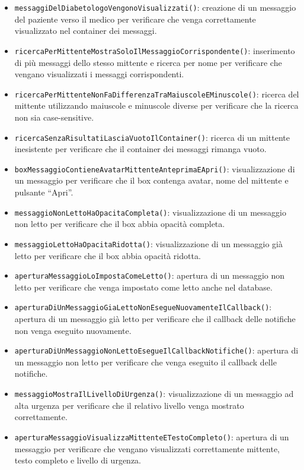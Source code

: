 \begin{itemize}
	
	\item \texttt{messaggiDelDiabetologoVengonoVisualizzati()}: creazione di un messaggio del paziente verso il medico per verificare che venga correttamente visualizzato nel container dei messaggi.
	
	\item \texttt{ricercaPerMittenteMostraSoloIlMessaggioCorrispondente()}: inserimento di più messaggi dello stesso mittente e ricerca per nome per verificare che vengano visualizzati i messaggi corrispondenti.
	
	\item \texttt{ricercaPerMittenteNonFaDifferenzaTraMaiuscoleEMinuscole()}: ricerca del mittente utilizzando maiuscole e minuscole diverse per verificare che la ricerca non sia case-sensitive.
	
	\item \texttt{ricercaSenzaRisultatiLasciaVuotoIlContainer()}: ricerca di un mittente inesistente per verificare che il container dei messaggi rimanga vuoto.
	
	\item \texttt{boxMessaggioContieneAvatarMittenteAnteprimaEApri()}: visualizzazione di un messaggio per verificare che il box contenga avatar, nome del mittente e pulsante ``Apri''.
	
	\item \texttt{messaggioNonLettoHaOpacitaCompleta()}: visualizzazione di un messaggio non letto per verificare che il box abbia opacità completa.
	
	\item \texttt{messaggioLettoHaOpacitaRidotta()}: visualizzazione di un messaggio già letto per verificare che il box abbia opacità ridotta.
	
	\item \texttt{aperturaMessaggioLoImpostaComeLetto()}: apertura di un messaggio non letto per verificare che venga impostato come letto anche nel database.
	
	\item \texttt{aperturaDiUnMessaggioGiaLettoNonEsegueNuovamenteIlCallback()}: apertura di un messaggio già letto per verificare che il callback delle notifiche non venga eseguito nuovamente.
	
	\item \texttt{aperturaDiUnMessaggioNonLettoEsegueIlCallbackNotifiche()}: apertura di un messaggio non letto per verificare che venga eseguito il callback delle notifiche.
	
	\item \texttt{messaggioMostraIlLivelloDiUrgenza()}: visualizzazione di un messaggio ad alta urgenza per verificare che il relativo livello venga mostrato correttamente.
	
	\item \texttt{aperturaMessaggioVisualizzaMittenteETestoCompleto()}: apertura di un messaggio per verificare che vengano visualizzati correttamente mittente, testo completo e livello di urgenza.
	
\end{itemize}

